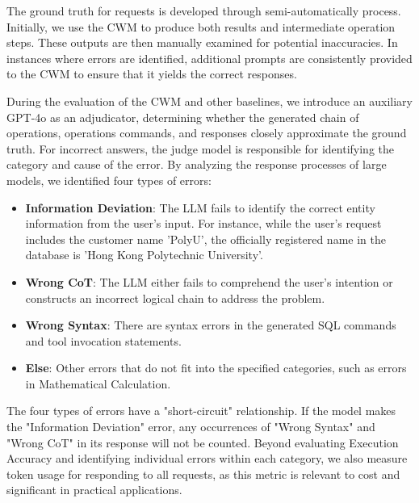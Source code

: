 \documentclass[preprint,12pt]{elsarticle}
\begin{document}
The ground truth for requests is developed through semi-automatically process.
Initially, we use the CWM to produce both results and intermediate operation steps.
These outputs are then manually examined for potential inaccuracies.
In instances where errors are identified, additional prompts are consistently provided to the CWM to ensure that it yields the correct responses.


During the evaluation of the CWM and other baselines, we introduce an auxiliary GPT-4o as an adjudicator, determining whether the generated chain of operations, operations commands, and responses closely approximate the ground truth.
For incorrect answers, the judge model is responsible for identifying the category and cause of the error. 
By analyzing the response processes of large models, we identified four types of errors:
\begin{itemize}
    \item \textbf{Information Deviation}: The LLM fails to identify the correct entity information from the user's input. For instance, while the user's request includes the customer name 'PolyU', the officially registered name in the database is 'Hong Kong Polytechnic University'.
    \item \textbf{Wrong CoT}: The LLM either fails to comprehend the user's intention or constructs an incorrect logical chain to address the problem.
    \item \textbf{Wrong Syntax}: There are syntax errors in the generated SQL commands and tool invocation statements.
    \item \textbf{Else}: Other errors that do not fit into the specified categories, such as errors in Mathematical Calculation. 
\end{itemize}

The four types of errors have a "short-circuit" relationship.
If the model makes the "Information Deviation" error, any occurrences of "Wrong Syntax" and "Wrong CoT" in its response will not be counted.
Beyond evaluating Execution Accuracy and identifying individual errors within each category, we also measure token usage for responding to all requests, as this metric is relevant to cost and significant in practical applications.
\end{document}

